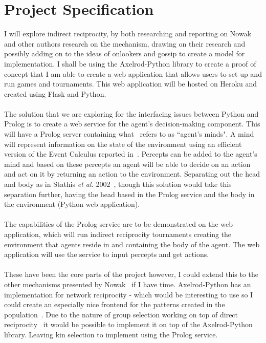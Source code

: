 \documentclass[]{final_report}
\begin{document}
\section{Project Specification}
I will explore indirect reciprocity, by both researching and reporting on Nowak and other authors research on the mechanism, drawing on their research and possibly adding on to the ideas of onlookers and gossip to create a model for implementation. I shall be using the Axelrod-Python library to create a proof of concept that I am able to create a web application that allows users to set up and run games and tournaments. This web application will be hosted on Heroku and created using Flask and Python.\\\\
The solution that we are exploring for the interfacing issues between Python and Prolog is to create a web service for the agent's decision-making component. This will have a Prolog server containing what~\cite{prosocs} refers to as ``agent's minds". A mind will represent information on the state of the environment using an efficient version of the Event Calculus reported in~\cite{mvfcec}. Percepts can be added to the agent's mind and based on these percepts an agent will be able to decide on an action and act on it by returning an action to the environment. Separating out the head and body as in Stathis \textit{et al.} 2002~\cite{prosocs}, though this solution would take this separation further, having the head based in the Prolog service and the body in the environment (Python web application).\\\\
The capabilities of the Prolog service are to be demonstrated on the web application, which will run indirect reciprocity tournaments creating the environment that agents reside in and containing the body of the agent. The web application will use the service to input percepts and get actions.\\\\
These have been the core parts of the project however, I could extend this to the other mechanisms presented by Nowak~\cite{five_rules_coop} if I have time. Axelrod-Python has an implementation for network reciprocity - which would be interesting to use so I could create an especially nice frontend for the patterns created in the population~\cite{spatial}. Due to the nature of group selection working on top of direct reciprocity~\cite{multilevel_nowak} it would be possible to implement it on top of the Axelrod-Python library. Leaving kin selection to implement using the Prolog service.
\end{document}
